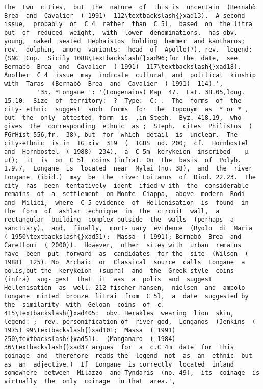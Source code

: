\documentclass[11pt]{article}
\begin{document}
\begin{Verbatim}[commandchars=\\\{\}]
the  two  cities,  but  the  nature  of  this is  uncertain  (Bernabò  Brea  and  Cavalier  ( 1991)  112\textbackslash{}xad13).  A second  issue,  probably  of  C 4  rather  than  C 5l,  based  on  the litra but  of  reduced  weight,  with  lower  denominations,  has obv.  young,  naked  seated  Hephaistos  holding  hammer  and kantharos;  rev.  dolphin,  among  variants:  head  of  Apollo(?), rev.  legend: (SNG  Cop.  Sicily 1088\textbackslash{}xad96;for the  date,  see  Bernabò  Brea  and  Cavalier  ( 1991)  117\textbackslash{}xad18). Another  C 4  issue  may  indicate  cultural  and  political  kinship with  Taras  (Bernabò  Brea  and  Cavalier  ( 1991)  114).',
         '35. *Longane ': '(Longenaios) Map  47.  Lat. 38.05,long. 15.10.  Size  of  territory:  ?  Type:  C: .  The  forms  of  the  city- ethnic  suggest  such  forms  for  the  toponym  as  * or * ,  but  the  only  attested  form  is  ,in Steph.  Byz. 418.19,  who  gives  the  corresponding  ethnic  as ;  Steph.  cites  Philistos  (  FGrHist 556,fr.  38), but  for  which  detail  is  unclear.  The  city-ethnic  is in  IG xiv  319  (  IGDS  no. 200;  cf.  Hornbostel and  Hornbostel  ( 1988)  234),  a  C 5m  kerykeion  inscribed    µ µ();  it  is  on  C 5l  coins (infra). On  the  basis  of  Polyb. 1.9.7,  Longane  is  located  near  Mylai (no. 38),  and  the  river  Longane  (ibid.)  may  be  the  river Loitanos  of  Diod. 22.23.  The  city  has  been  tentatively  ident- ified w ith  the  considerable  remains  of  a  settlement  on Monte  Ciappa,  above  modern  Rodi  and  Milici,  where  C 5 evidence  of  Hellenisation  is  found  in  the  form  of  ashlar technique  in  the  circuit  wall,  a  rectangular  building  complex outside  the  walls  (perhaps  a  sanctuary),  and,  finally,  mort- uary  evidence  (Ryolo  di  Maria  ( 1950\textbackslash{}xad51);  Massa  ( 1991); Bernabò  Brea  and  Carettoni  ( 2000)).  However,  other  sites with  urban  remains  have  been  put  forward  as  candidates  for the  site  (Wilson  ( 1988)  125). No  Archaic  or  Classical  source  calls  Longane  a  polis,but the  kerykeion  (supra)  and  the  Greek-style  coins  (infra)  sug- gest  that  it  was  a  polis  and  suggest  Hellenisation  as  well. 212 fischer-hansen,  nielsen  and  ampolo Longane  minted  bronze  litrai  from  C 5l,  a  date  suggested by  the  similarity  with  Geloan  coins  of  c. 415\textbackslash{}xad405:  obv. Herakles  wearing  lion  skin,  legend: ;  rev. personification of  river-god,  Longanos  (Jenkins  ( 1975) 99\textbackslash{}xad101;  Massa  ( 1991)  250\textbackslash{}xad51).  (Manganaro  ( 1984)  36\textbackslash{}xad37 argues  for  a  c.C 4m  date  for  this  coinage  and  therefore  reads the  legend  not  as  an  ethnic  but  as  an  adjective.)  If  Longane  is correctly  located  inland  somewhere  between  Milazzo  and Tyndaris  (no. 49),  its  coinage  is  virtually  the  only  coinage  in that  area.',

\end{Verbatim}
\end{document}

